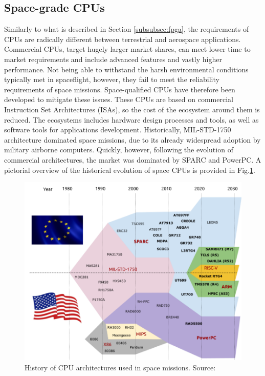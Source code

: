 \subsection{Space-grade CPUs}\label{subsubsec:cpu}
Similarly to what is described in Section \ref{subsubsec:fpga}, the requirements of CPUs are radically different between terrestrial and aerospace applications. Commercial CPUs, target hugely larger market shares, can meet lower time to market requirements and include advanced features and vastly higher performance. Not being able to withstand the harsh environmental conditions typically met in spaceflight, however, they fail to meet the reliability requirements of space missions. Space-qualified CPUs have therefore been developed to mitigate these issues. These CPUs are based on commercial Instruction Set Architectures (ISAs), so the cost of the ecosystem around them is reduced. The ecosystems includes hardware design processes and tools, as well as software tools for applications development. Historically, MIL-STD-1750 architecture \cite{MIL-STD-1750} dominated space missions, due to its already widespread adoption by military airborne computers. Quickly, however, following the evolution of commercial architectures, the market was dominated by SPARC and PowerPC. A pictorial overview of the historical evolution of space CPUs is provided in Fig.\ref{fig:CPU-Archs}. 
	\begin{figure}
		\centering
		\includegraphics[width=0.6\linewidth]{Figures/CPUsHistory.png}
		\caption{History of CPU architectures used in space missions. Source: \cite{DiMascio2020}}
		\label{fig:CPU-Archs}
	\end{figure}
